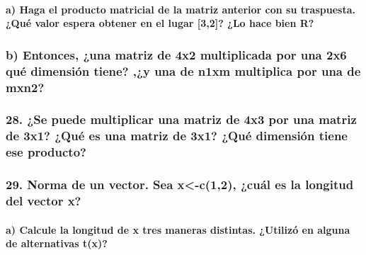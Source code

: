 \documentclass[
]{article}
\begin{document}
\hypertarget{a-haga-el-producto-matricial-de-la-matriz-anterior-con-su-traspuesta.-quuxe9-valor-espera-obtener-en-el-lugar-32-lo-hace-bien-r}{%
\paragraph{a) Haga el producto matricial de la matriz anterior con su
traspuesta. ¿Qué valor espera obtener en el lugar {[}3,2{]}? ¿Lo hace
bien
R?}\label{a-haga-el-producto-matricial-de-la-matriz-anterior-con-su-traspuesta.-quuxe9-valor-espera-obtener-en-el-lugar-32-lo-hace-bien-r}}

\hypertarget{b-entonces-una-matriz-de-4x2-multiplicada-por-una-2x6-quuxe9-dimensiuxf3n-tiene-y-una-de-n1xm-multiplica-por-una-de-mxn2}{%
\subsubsection{b) Entonces, ¿una matriz de 4x2 multiplicada por una 2x6
qué dimensión tiene? ,¿y una de n1xm multiplica por una de
mxn2?}\label{b-entonces-una-matriz-de-4x2-multiplicada-por-una-2x6-quuxe9-dimensiuxf3n-tiene-y-una-de-n1xm-multiplica-por-una-de-mxn2}}

\hypertarget{se-puede-multiplicar-una-matriz-de-4x3-por-una-matriz-de-3x1-quuxe9-es-una-matriz-de-3x1-quuxe9-dimensiuxf3n-tiene-ese-producto}{%
\subsubsection{28. ¿Se puede multiplicar una matriz de 4x3 por una
matriz de 3x1? ¿Qué es una matriz de 3x1? ¿Qué dimensión tiene ese
producto?}\label{se-puede-multiplicar-una-matriz-de-4x3-por-una-matriz-de-3x1-quuxe9-es-una-matriz-de-3x1-quuxe9-dimensiuxf3n-tiene-ese-producto}}

\hypertarget{norma-de-un-vector.-sea-x-c12-cuuxe1l-es-la-longitud-del-vector-x}{%
\subsubsection{29. Norma de un vector. Sea x\textless-c(1,2), ¿cuál es
la longitud del vector
x?}\label{norma-de-un-vector.-sea-x-c12-cuuxe1l-es-la-longitud-del-vector-x}}

\hypertarget{a-calcule-la-longitud-de-x-tres-maneras-distintas.-utilizuxf3-en-alguna-de-alternativas-tx}{%
\paragraph{a) Calcule la longitud de x tres maneras distintas. ¿Utilizó
en alguna de alternativas
t(x)?}\label{a-calcule-la-longitud-de-x-tres-maneras-distintas.-utilizuxf3-en-alguna-de-alternativas-tx}}
\end{document}
